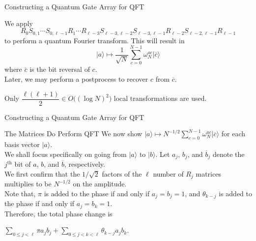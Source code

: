 \documentclass{beamer}
\renewcommand{\:}{\text{ }}
\begin{document}
    \begin{frame}{Constructing a Quantum Gate Array for QFT}
        \begin{block}{}
            We apply
            \[R_0 S_{0,1} \cdots S_{0,\ell-1} R_1 \cdots R_{\ell-3} S_{\ell-3,\ell-2} S_{\ell-3, \ell-1} R_{\ell-2} S_{\ell-2,\ell-1} R_{\ell-1} \]
            to perform a quantum Fourier transform. This will result in
            \[\vert a \rangle \mapsto \frac{1}{\sqrt{N}}\sum_{c=0}^{N-1} \omega_N^{ac} \vert \overline{c} \rangle\]
            where $\overline{c}$ is the bit reversal of $c$. \\[.5em]
            Later, we may perform a postprocess to recover $c$ from $\overline{c}$.
        \end{block}
        \begin{alertblock}{}
            \centerline{Only $\dfrac{\ell(\ell+1)}{2} \in O\big( (\log N)^2 \big)$ local transformations are used.}
        \end{alertblock}
    \end{frame}

    \begin{frame}{Constructing a Quantum Gate Array for QFT}
        \begin{block}{The Matrices Do Perform QFT}
            We now show
            $\vert a \rangle \mapsto N^{-1/2} \sum_{c=0}^{N-1} \omega_N^{ac} \vert \overline{c} \rangle$
            for each basis vector $\vert a \rangle$. \\[1em]
            We shall focus specifically on going from $\vert a \rangle$ to $\vert b \rangle$.
            Let $a_j$, $b_j$, and $\overline{b}_j$ denote the $j^\text{th}$ bit of $a$, $b$, and $\overline{b}$, respectively. \\[.5em]
            We first confirm that the $1/\sqrt{2}$ factors of the $\ell$ number of $R_j$ matrices multiplies to be $N^{-1/2}$ on the amplitude. \\[.5em]
            Note that, $\pi$ is added to the phase if and only if $a_j = b_j = 1$,
            and $\theta_{k-j}$ is added to the phase if and only if $a_j = b_k = 1$.\\[.5em]
            Therefore, the total phase change is\\[.5em]
            \centerline{$\displaystyle \sum_{0 \leq j < \ell} \pi a_j b_j + \sum_{0 \leq j < k < \ell} \theta_{k-j} a_j b_k$.}
        \end{block}
    \end{frame}
\end{document}
